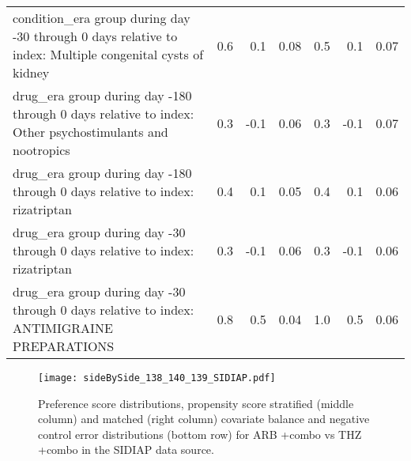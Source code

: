 \documentclass[11pt,]{article}
\begin{document}
\begin{longtable}{p{30em}rrrrrr}
  condition\_era group during day -30 through 0 days relative to index: Multiple congenital cysts of kidney & 0.6 & 0.1 & 0.08 & 0.5 & 0.1 & 0.07 \\ 
  drug\_era group during day -180 through 0 days relative to index: Other psychostimulants and nootropics & 0.3 & -0.1 & 0.06 & 0.3 & -0.1 & 0.07 \\ 
  drug\_era group during day -180 through 0 days relative to index: rizatriptan & 0.4 & 0.1 & 0.05 & 0.4 & 0.1 & 0.06 \\ 
  drug\_era group during day -30 through 0 days relative to index: rizatriptan & 0.3 & -0.1 & 0.06 & 0.3 & -0.1 & 0.06 \\ 
  drug\_era group during day -30 through 0 days relative to index: ANTIMIGRAINE PREPARATIONS & 0.8 & 0.5 & 0.04 & 1.0 & 0.5 & 0.06 \\ 
  \bottomrule
\end{longtable}
\clearpage\begin{figure}[H]
    \caption{Preference score distributions,
    propensity score stratified (middle column) and matched (right column) covariate balance
    and negative control error distributions (bottom row) for
    ARB +combo vs THZ +combo in the SIDIAP data source.}
    \centerline{
        \texttt{[image: sideBySide\_138\_140\_139\_SIDIAP.pdf]}
    }
\end{figure}
\end{document}
